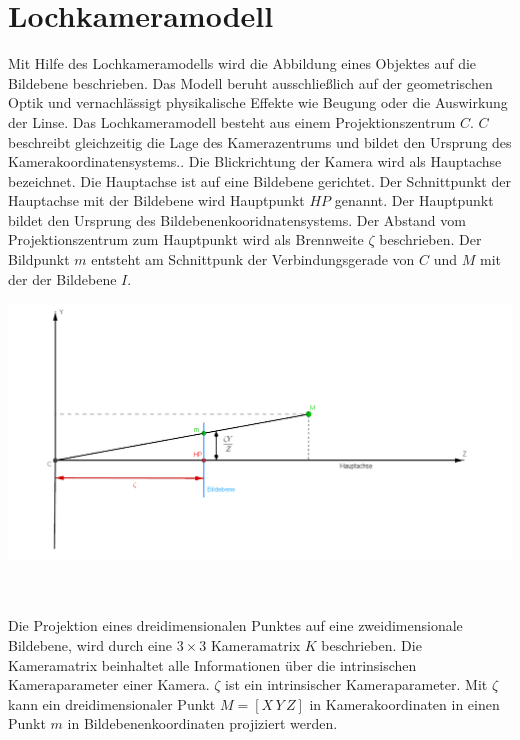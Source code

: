 \section{Lochkameramodell}

Mit Hilfe des Lochkameramodells wird die Abbildung eines Objektes auf die Bildebene beschrieben.
Das Modell beruht ausschließlich auf der geometrischen Optik und vernachlässigt physikalische Effekte wie Beugung oder die Auswirkung der Linse\cite{Heipke}. Das Lochkameramodell besteht aus einem Projektionszentrum $C$. $C$ beschreibt gleichzeitig die Lage des Kamerazentrums und bildet den Ursprung des Kamerakoordinatensystems.\cite{CamerModels.,HZ}.
Die Blickrichtung der Kamera wird als Hauptachse bezeichnet. Die Hauptachse ist auf eine Bildebene gerichtet. Der Schnittpunkt der Hauptachse mit der Bildebene wird Hauptpunkt $HP$ genannt. Der Hauptpunkt bildet den Ursprung des Bildebenenkooridnatensystems. Der Abstand vom Projektionszentrum zum Hauptpunkt wird als Brennweite $\zeta$ beschrieben\cite{HZ,CamerModels.}. Der Bildpunkt $m$ entsteht am Schnittpunk der Verbindungsgerade von $C$ und $M$ mit der der Bildebene $I$. 

\begin{minipage}{\linewidth}
	\centering
	\includegraphics[width=.8\linewidth]{images/PinholeCameraModell2D.png}
	\label{fig:PinholeCamera2D}
\end{minipage}\\ \\

Die Projektion eines dreidimensionalen Punktes auf eine zweidimensionale Bildebene, wird durch eine $3 \times 3$ Kameramatrix $K$ beschrieben. Die Kameramatrix beinhaltet alle Informationen über die intrinsischen Kameraparameter einer Kamera. $\zeta$ ist ein intrinsischer Kameraparameter. Mit $\zeta$ kann ein dreidimensionaler Punkt  $M=[X\,Y\,Z]$ in Kamerakoordinaten in einen Punkt $m$ in Bildebenenkoordinaten projiziert werden.

